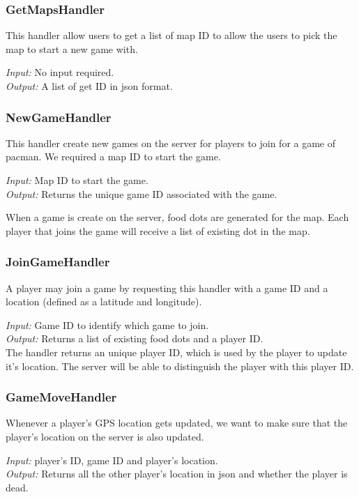 \documentclass{acm_proc_article-sp}
\begin{document}
\subsubsection{GetMapsHandler}
This handler allow users to get a list of map ID to allow the users to
pick the map to start a new game with.

\emph{Input:} No input required.\\
\emph{Output:} A list of get ID in json format.

\subsubsection{NewGameHandler}\label{newgame}
This handler create new games on the server for players to join for a
game of pacman. We required a map ID to start the game.

\emph{Input:} Map ID to start the game.\\
\emph{Output:} Returns the unique game ID associated with the game.

When a game is create on the server, food dots are generated for the
map. Each player that joins the game will receive a list of existing
dot in the map.

\subsubsection{JoinGameHandler}
A player may join a game by requesting this handler with a game ID and
a location (defined as a latitude and longitude).

\emph{Input:} Game ID to identify which game to join.\\
\emph{Output:} Returns a list of existing food dots and a player ID.\\

The handler returns an unique player ID, which is used by the player
to update it's location. The server will be able to distinguish the
player with this player ID.

\subsubsection{GameMoveHandler}
Whenever a player's GPS location gets updated, we want to make sure
that the player's location on the server is also updated.

\emph{Input:} player's ID, game ID and player's location.\\
\emph{Output:} Returns all the other player's location in json and
whether the player is dead.
\end{document}
